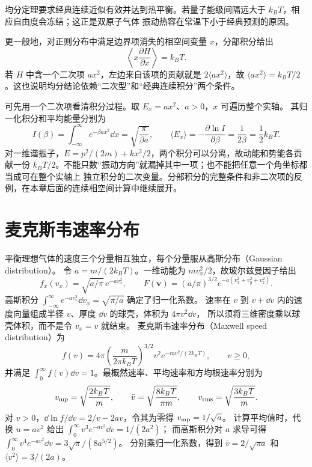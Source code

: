 均分定理要求经典连续近似有效并达到热平衡。若量子能级间隔远大于 $k_BT$，相应自由度会冻结；这正是双原子气体
振动热容在常温下小于经典预测的原因。

更一般地，对正则分布中满足边界项消失的相空间变量 $x$，分部积分给出
\begin{equation}
 \left\langle x\frac{\partial H}{\partial x}\right\rangle=k_BT.
\end{equation}
若 $H$ 中含一个二次项 $ax^2$，左边来自该项的贡献就是 $2\langle ax^2\rangle$，故
$\langle ax^2\rangle=k_BT/2$。这也说明均分结论依赖“二次型”和“经典连续积分”两个条件。

可先用一个二次项看清积分过程。取 $E_x=ax^2$、$a>0$，$x$ 可遍历整个实轴。
其归一化积分和平均能量分别为
\[
 I(\beta)=\int_{-\infty}^{\infty}e^{-\beta ax^2}\dd x
 =\sqrt{\frac{\pi}{\beta a}},\qquad
 \langle E_x\rangle=-\frac{\partial\ln I}{\partial\beta}
 =\frac1{2\beta}=\frac12k_BT.
\]
对一维谐振子，$E=p^2/(2m)+kx^2/2$，两个积分可以分离，故动能和势能各贡献一份
$k_BT/2$。不能只数“振动方向”就漏掉其中一项；也不能把任意一个角坐标都当成可在整个实轴上
独立积分的二次变量。分部积分的完整条件和非二次项的反例，在本章后面的连续相空间计算中继续展开。

\section{麦克斯韦速率分布}

平衡理想气体的速度三个分量相互独立，每个分量服从高斯分布（Gaussian distribution）。
令 $a=m/(2k_BT)$。一维动能为 $mv_x^2/2$，故玻尔兹曼因子给出
\[f_x(v_x)=\sqrt{a/\pi}\,e^{-av_x^2},\qquad
F(\boldsymbol v)=(a/\pi)^{3/2}e^{-a(v_x^2+v_y^2+v_z^2)}.\]
高斯积分 $\int_{-\infty}^{\infty}e^{-av_x^2}\dd v_x=\sqrt{\pi/a}$ 确定了归一化系数。
速率在 $v$ 到 $v+\dd v$ 内的速度向量组成半径 $v$、厚度 $\dd v$ 的球壳，体积为 $4\pi v^2\dd v$，
所以须将三维密度乘以球壳体积，而不是令 $v_x=v$ 就结束。
麦克斯韦速率分布（Maxwell speed distribution）为
\begin{equation}
 f(v)=4\pi\left(\frac{m}{2\pi k_BT}\right)^{3/2}
 v^2e^{-mv^2/(2k_BT)},\qquad v\ge0,
\end{equation}
并满足 $\int_0^\infty f(v)\dd v=1$。最概然速率、平均速率和方均根速率分别为
\begin{equation}
 v_{\rm mp}=\sqrt{\frac{2k_BT}{m}},\qquad
 \bar v=\sqrt{\frac{8k_BT}{\pi m}},\qquad
 v_{\rm rms}=\sqrt{\frac{3k_BT}{m}}.
\end{equation}
对 $v>0$，$\dd\ln f/\dd v=2/v-2av$，令其为零得 $v_{\rm mp}=1/\sqrt a$。
计算平均值时，代换 $u=av^2$ 给出 $\int_0^\infty v^3e^{-av^2}\dd v=1/(2a^2)$；
而高斯积分对 $a$ 求导可得 $\int_0^\infty v^4e^{-av^2}\dd v=3\sqrt\pi/(8a^{5/2})$。
分别乘归一化系数，得到 $\bar v=2/\sqrt{\pi a}$ 和 $\langle v^2\rangle=3/(2a)$。


